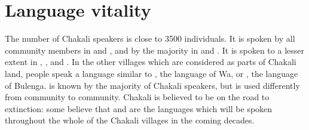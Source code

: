 \section{Language vitality}
\label{sec:vital}

The number of Chakali speakers is close to 3500 individuals. It is spoken by all community members in  and , and by the majority in  and . It is spoken to a lesser extent in , ,  and .  In the other villages which are considered as  parts of Chakali land, people speak a language similar to , the language of  Wa, or , the language of Bulenga.  is known by the majority of Chakali speakers,  but is used differently from community to community.   Chakali is believed to be on the road to extinction: some believe that  and  are the languages which will be spoken throughout the whole of the Chakali villages in the coming decades.



